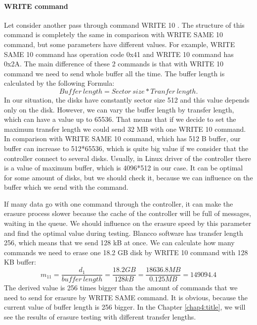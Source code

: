 \paragraph{WRITE command}
Let consider another pass through command WRITE 10 \cite{scsi3_bc}. The structure of this command is completely the same in comparison with WRITE SAME 10 command, but some parameters have different values. For example, WRITE SAME 10 command has operation code 0x41 and WRITE 10 command has 0x2A. The main difference of these 2 commands is that with WRITE 10 command we need to send whole buffer all the time. The buffer length is calculated by the following Formula:
\begin{equation}
	Buffer~length = Sector~size * Tranfer~length.
\end{equation}
In our situation, the disks have constantly sector size 512 and this value depends only on the disk. However, we can vary the buffer length by transfer length, which can have a value up to 65536. That means that if we decide to set the maximum transfer length we could send 32 MB with one WRITE 10 command. In comparison with WRITE SAME 10 command, which has 512 B buffer, our buffer can increase to 512*65536, which is quite big value if we consider that the controller connect to several disks. Usually, in Linux driver of the controller there is a value of maximum buffer, which is 4096*512 in our case. It can be optimal for some amount of disks, but we should check it, because we can influence on the buffer which we send with the command.

If many data go with one command through the controller, it can make the erasure process slower because the cache of the controller will be full of messages, waiting in the queue. We should influence on the erasure speed by this parameter and find the optimal value during testing. Blancco software has transfer length 256, which means that we send 128 kB at once. We can calculate how many commands we need to erase one 18.2 GB disk by WRITE 10 command with 128 KB buffer:
\begin{equation}
	m_{11}=\frac{d_{1}}{buffer~length}=\frac{18.2GB}{128kB}=\frac{18636.8MB}{0.125MB}=149094.4
\end{equation}
The derived value is 256 times bigger than the amount of commands that we need to send for erasure by WRITE SAME command. It is obvious, because the current value of buffer length is 256 bigger. In the Chapter \ref{chap4:title}, we will see the results of erasure testing with different transfer lengths.














